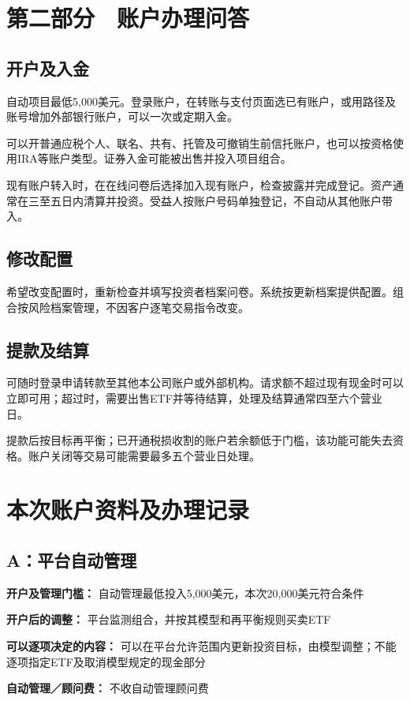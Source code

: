 \documentclass[UTF8,fontset=none,11pt,a4paper]{ctexart}
\begin{document}
\section*{第二部分　账户办理问答}
\subsection*{开户及入金}
自动项目最低5,000美元。登录账户，在转账与支付页面选已有账户，或用路径及账号增加外部银行账户，可以一次或定期入金。


可以开普通应税个人、联名、共有、托管及可撤销生前信托账户，也可以按资格使用IRA等账户类型。证券入金可能被出售并投入项目组合。


现有账户转入时，在在线问卷后选择加入现有账户，检查披露并完成登记。资产通常在三至五日内清算并投资。受益人按账户号码单独登记，不自动从其他账户带入。


\subsection*{修改配置}
希望改变配置时，重新检查并填写投资者档案问卷。系统按更新档案提供配置。组合按风险档案管理，不因客户逐笔交易指令改变。


\subsection*{提款及结算}
可随时登录申请转款至其他本公司账户或外部机构。请求额不超过现有现金时可以立即可用；超过时，需要出售ETF并等待结算，处理及结算通常四至六个营业日。


提款后按目标再平衡；已开通税损收割的账户若余额低于门槛，该功能可能失去资格。账户关闭等交易可能需要最多五个营业日处理。


\section*{本次账户资料及办理记录}
\subsection*{A：平台自动管理}
\textbf{开户及管理门槛：} 自动管理最低投入5,000美元，本次20,000美元符合条件


\textbf{开户后的调整：} 平台监测组合，并按其模型和再平衡规则买卖ETF


\textbf{可以逐项决定的内容：} 可以在平台允许范围内更新投资目标，由模型调整；不能逐项指定ETF及取消模型规定的现金部分


\textbf{自动管理／顾问费：} 不收自动管理顾问费
\end{document}
